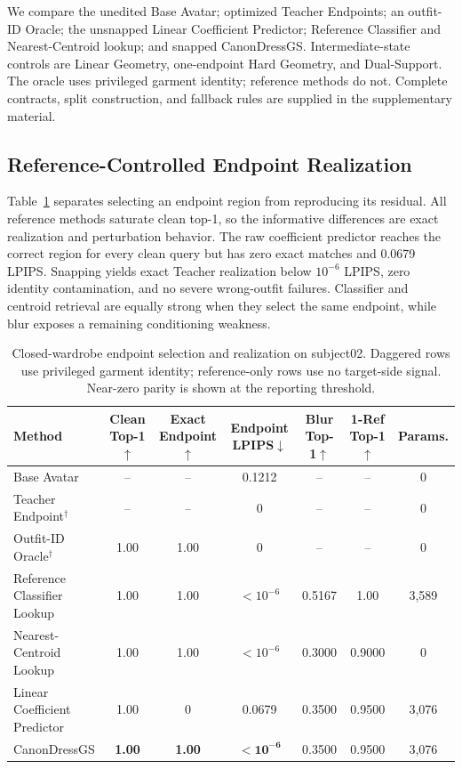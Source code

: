 \documentclass[letterpaper]{article}
\newcommand{\method}{CanonDressGS}
\newcommand{\dual}{Dual-Support}
\begin{document}

We compare the unedited Base Avatar; optimized Teacher Endpoints; an outfit-ID Oracle; the unsnapped Linear Coefficient Predictor; Reference Classifier and Nearest-Centroid lookup; and snapped \method{}. Intermediate-state controls are Linear Geometry, one-endpoint Hard Geometry, and \dual{}. The oracle uses privileged garment identity; reference methods do not. Complete contracts, split construction, and fallback rules are supplied in the supplementary material.

\subsection{Reference-Controlled Endpoint Realization}

Table~\ref{tab:endpoint} separates selecting an endpoint region from reproducing its residual. All reference methods saturate clean top-1, so the informative differences are exact realization and perturbation behavior. The raw coefficient predictor reaches the correct region for every clean query but has zero exact matches and 0.0679 LPIPS. Snapping yields exact Teacher realization below $10^{-6}$ LPIPS, zero identity contamination, and no severe wrong-outfit failures. Classifier and centroid retrieval are equally strong when they select the same endpoint, while blur exposes a remaining conditioning weakness.

\begin{table}[t]
\centering
\small
\setlength{\tabcolsep}{4.3pt}
\caption{Closed-wardrobe endpoint selection and realization on subject02. Daggered rows use privileged garment identity; reference-only rows use no target-side signal. Near-zero parity is shown at the reporting threshold.}
\label{tab:endpoint}
\begin{tabular}{@{}lcccccc@{}}
\toprule
Method & Clean Top-1$\uparrow$ & Exact Endpoint$\uparrow$ & Endpoint LPIPS$\downarrow$ & Blur Top-1$\uparrow$ & 1-Ref Top-1$\uparrow$ & Params.\\
\midrule
Base Avatar & -- & -- & 0.1212 & -- & -- & 0\\
Teacher Endpoint$^\dagger$ & -- & -- & 0 & -- & -- & 0\\
Outfit-ID Oracle$^\dagger$ & 1.00 & 1.00 & 0 & -- & -- & 0\\
Reference Classifier Lookup & 1.00 & 1.00 & $<10^{-6}$ & 0.5167 & 1.00 & 3,589\\
Nearest-Centroid Lookup & 1.00 & 1.00 & $<10^{-6}$ & 0.3000 & 0.9000 & 0\\
Linear Coefficient Predictor & 1.00 & 0 & 0.0679 & 0.3500 & 0.9500 & 3,076\\
\method{} & \textbf{1.00} & \textbf{1.00} & $\mathbf{<10^{-6}}$ & 0.3500 & 0.9500 & 3,076\\
\bottomrule
\end{tabular}
\end{table}
\end{document}
